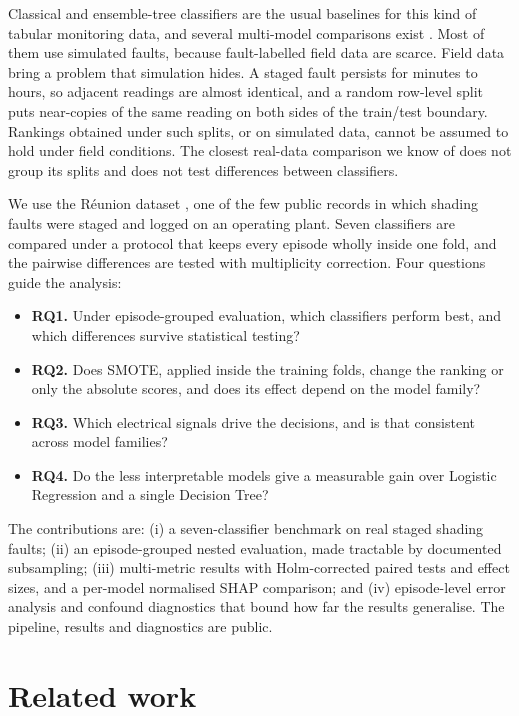 \documentclass[11pt,a4paper]{article}
\begin{document}
Classical and ensemble-tree classifiers are the usual baselines for this kind of tabular monitoring data, and several multi-model comparisons exist \citep{Eldeghady2024,Khandeparkar2025,Mouleloued2025}. Most of them use simulated faults, because fault-labelled field data are scarce. Field data bring a problem that simulation hides. A staged fault persists for minutes to hours, so adjacent readings are almost identical, and a random row-level split puts near-copies of the same reading on both sides of the train/test boundary. Rankings obtained under such splits, or on simulated data, cannot be assumed to hold under field conditions. The closest real-data comparison we know of \citep{TocheTchio2024} does not group its splits and does not test differences between classifiers.

We use the R\'eunion dataset \citep{Graillet2022}, one of the few public records in which shading faults were staged and logged on an operating plant. Seven classifiers are compared under a protocol that keeps every episode wholly inside one fold, and the pairwise differences are tested with multiplicity correction. Four questions guide the analysis:
\begin{itemize}
\item \textbf{RQ1.} Under episode-grouped evaluation, which classifiers perform best, and which differences survive statistical testing?
\item \textbf{RQ2.} Does SMOTE, applied inside the training folds, change the ranking or only the absolute scores, and does its effect depend on the model family?
\item \textbf{RQ3.} Which electrical signals drive the decisions, and is that consistent across model families?
\item \textbf{RQ4.} Do the less interpretable models give a measurable gain over Logistic Regression and a single Decision Tree?
\end{itemize}

The contributions are: (i) a seven-classifier benchmark on real staged shading faults; (ii) an episode-grouped nested evaluation, made tractable by documented subsampling; (iii) multi-metric results with Holm-corrected paired tests and effect sizes, and a per-model normalised SHAP comparison; and (iv) episode-level error analysis and confound diagnostics that bound how far the results generalise. The pipeline, results and diagnostics are public.

\section{Related work}
\end{document}

